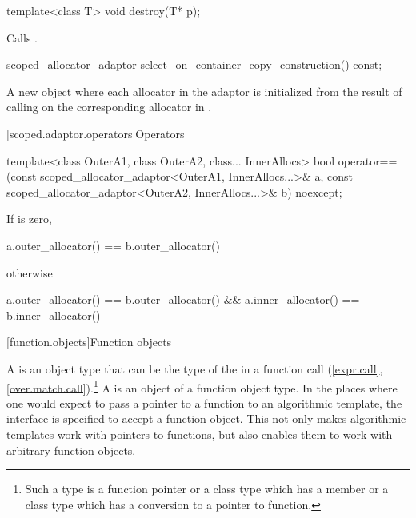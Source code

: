 %
\begin{itemdecl}
template<class T>
  void destroy(T* p);
\end{itemdecl}

\begin{itemdescr}
\pnum
\effects
Calls .
\end{itemdescr}

%
\begin{itemdecl}
scoped_allocator_adaptor select_on_container_copy_construction() const;
\end{itemdecl}

\begin{itemdescr}
\pnum
\returns
A new  object where each allocator  in the
adaptor is initialized from the result of calling
 on the
corresponding allocator in .
\end{itemdescr}

[scoped.adaptor.operators]{Operators}

%
\begin{itemdecl}
template<class OuterA1, class OuterA2, class... InnerAllocs>
  bool operator==(const scoped_allocator_adaptor<OuterA1, InnerAllocs...>& a,
                  const scoped_allocator_adaptor<OuterA2, InnerAllocs...>& b) noexcept;
\end{itemdecl}

\begin{itemdescr}
\pnum
\returns
If  is zero,
\begin{codeblock}
a.outer_allocator() == b.outer_allocator()
\end{codeblock}
otherwise
\begin{codeblock}
a.outer_allocator() == b.outer_allocator() && a.inner_allocator() == b.inner_allocator()
\end{codeblock}
\end{itemdescr}

[function.objects]{Function objects}

\pnum
A  is an object
type that can be the type of the
 in a function call
(\ref{expr.call}, \ref{over.match.call}).\footnote{Such a type is a function
pointer or a class type which has a member  or a class type
which has a conversion to a pointer to function.} A  is an
object of a function object type. In the places where one would expect to pass a
pointer to a function to an algorithmic template, the
interface is specified to accept a function object. This not only makes
algorithmic templates work with pointers to functions, but also enables them to
work with arbitrary function objects.

